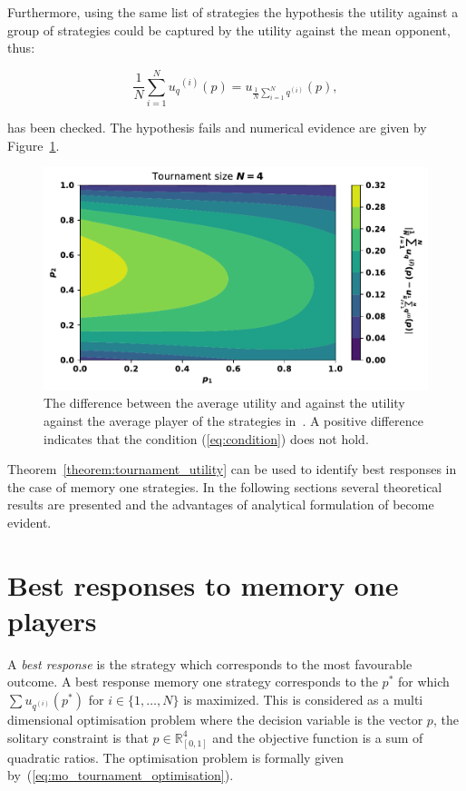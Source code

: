 \documentclass[10pt]{article}
\newcommand{\R}{\mathbb{R}}
\begin{document}
Furthermore, using the same list of strategies the 
hypothesis the utility against a group of strategies could be
captured by the utility against the mean opponent, thus:

\begin{equation}\label{eq:condition}
    \frac{1}{N} \sum_{i=1} ^ {N} {u_q}^{(i)} (p) = u_{\frac {1}{N} \sum\limits_{i=1} ^ N q^{(i)}}(p),
\end{equation}

has been checked. The hypothesis fails and numerical evidence are given by
Figure~\ref{fig:hypothesis}.

\begin{figure}[!htbp]
    \begin{center}
    \includegraphics[width=.5\linewidth]{img/mean_vs_average_heatmap.pdf}
    \end{center}
    \caption{The difference between the average utility and against
    the utility against the average player of the strategies in~\cite{Stewart2012}.
    A positive difference indicates that the condition (\ref{eq:condition})
    does not hold.}
    \label{fig:hypothesis}
\end{figure}

Theorem~\ref{theorem:tournament_utility} can be used to identify best
responses in the case of memory one strategies. In the following sections several
theoretical results are presented and the advantages of analytical formulation
of become evident.

\section{Best responses to memory one players}\label{section:best_response_mem_one}

A \textit{best response} is the strategy which corresponds to the most
favourable outcome. A best response memory one strategy
corresponds to the \(p^*\) for which \(\sum u_{q ^{(i)}} (p^*)\) for \(i \in \{1, \dots, N\}\)
is maximized. This is considered as a multi dimensional optimisation problem
where the decision variable is the vector \(p\), the solitary constraint is
that \(p \in \R^4_{[0, 1]} \) and the objective function is a sum of quadratic
ratios. The optimisation problem is formally given by~(\ref{eq:mo_tournament_optimisation}).
\end{document}
